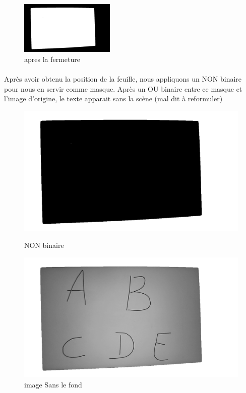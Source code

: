 \documentclass[a4paper]{article}
\begin{document}
				\begin{figure}[H]
					\centering
					\includegraphics[width=0.4\textwidth]{apresFermeture.png}
					\caption{apres la fermeture}
					\label{fig:apresFermeture}
				\end{figure}

				\paragraph{} Après avoir obtenu la position de la feuille, nous appliquons un NON binaire pour nous en servir comme masque. Après un OU binaire entre ce masque et l'image d'origine, le texte apparait sans la scène (mal dit à reformuler)



				\begin{figure}[H]
					\centering
					\begin{minipage}{.5\textwidth}
					  \centering
					  \includegraphics[width=.8\linewidth]{nonBinaireOtsu.png}
					  \caption{NON binaire}
					  \label{fig:nonBinaireOtsu}
					\end{minipage}%
					\begin{minipage}{.5\textwidth}
					  \centering
					  \includegraphics[width=.8\linewidth]{imageSansFond.png}
					  \caption{image Sans le fond}
					  \label{fig:imageSansFond}
					\end{minipage}
				\end{figure}
\end{document}
